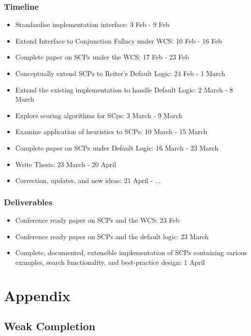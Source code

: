 \documentclass{article}
\begin{document}
\subsubsection*{Timeline}
\begin{itemize}
\item Standardise implementation interface: 3 Feb - 9 Feb
\item Extend Interface to Conjunction Fallacy under WCS: 10 Feb - 16 Feb
\item Complete paper on SCPs under the WCS: 17 Feb - 23 Feb
\item Conceptually extend SCPs to Reiter's Default Logic: 24 Feb - 1 March
\item Extend the existing implementation to handle Default Logic: 2 March - 8 March
\item Explore scoring algorithms for SCps: 3 March - 9 March
\item Examine application of heuristics to SCPs: 10 March - 15 March
\item Complete paper on SCPs under Default Logic: 16 March - 23 March
\item Write Thesis: 23 March - 20 April
\item Correction, updates, and new ideas: 21 April - ...
\end{itemize}

\subsubsection*{Deliverables}
\begin{itemize}
\item Conference ready paper on SCPs and the WCS: 23 Feb
\item Conference ready paper on SCPs and the default logic: 23 March
\item Complete, documented, extensible implementation of SCPs containing various examples, search functionality, and best-practice design: 1 April
\end{itemize}
	



\newpage

\section{Appendix}
\subsection{Weak Completion} \label{ssec:weakcompletion}
\end{document}
